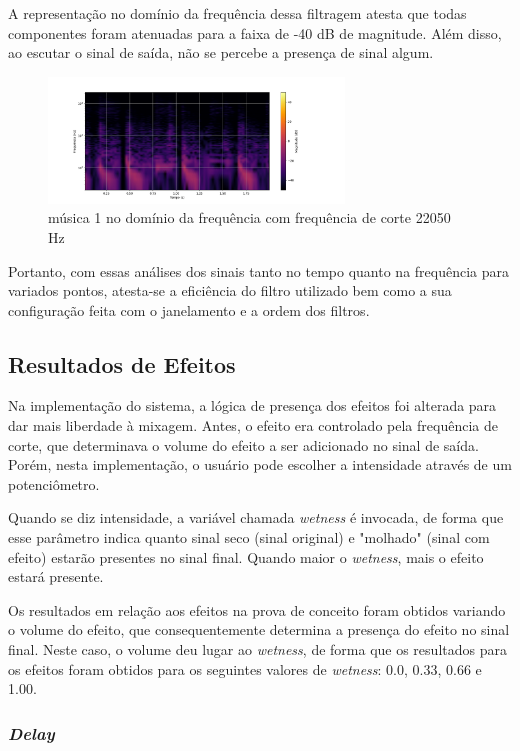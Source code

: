 A representação no domínio da frequência dessa filtragem atesta que todas componentes foram atenuadas para a faixa de -40 dB de magnitude. Além disso, ao escutar o sinal de saída, não se percebe a presença de sinal algum. 

\begin{figure}[h]
    \centering
    \includegraphics[width=0.7\textwidth]{figuras/fig88.png}
    \caption{música 1 no domínio da frequência com frequência de corte 22050 Hz}
    \label{fig88}
\end{figure}

Portanto, com essas análises dos sinais tanto no tempo quanto na frequência para variados pontos, atesta-se a eficiência do filtro utilizado bem como a sua configuração feita com o janelamento e a ordem dos filtros.

\subsection{Resultados de Efeitos}

Na implementação do sistema, a lógica de presença dos efeitos foi alterada para dar mais liberdade à mixagem. Antes, o efeito era controlado pela frequência de corte, que determinava o volume do efeito a ser adicionado no sinal de saída. Porém, nesta implementação, o usuário pode escolher a intensidade através de um potenciômetro.

Quando se diz intensidade, a variável chamada \textit{wetness} é invocada, de forma que esse parâmetro indica quanto sinal seco (sinal original) e "molhado" (sinal com efeito) estarão presentes no sinal final. Quando maior o \textit{wetness}, mais o efeito estará presente. 

Os resultados em relação aos efeitos na prova de conceito foram obtidos variando o volume do efeito, que consequentemente determina a presença do efeito no sinal final. Neste caso, o volume deu lugar ao \textit{wetness}, de forma que os resultados para os efeitos foram obtidos para os seguintes valores de \textit{wetness}: 0.0, 0.33, 0.66 e 1.00. 

\subsubsection*{\textit{Delay}}

